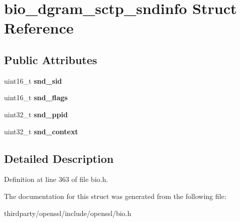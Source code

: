 \hypertarget{structbio__dgram__sctp__sndinfo}{}\section{bio\+\_\+dgram\+\_\+sctp\+\_\+sndinfo Struct Reference}
\label{structbio__dgram__sctp__sndinfo}
\subsection*{Public Attributes}
\begin{DoxyCompactItemize}
\item 
\mbox{\label{structbio__dgram__sctp__sndinfo_ab22988d5927028b0284c6cf18ff589dc}} 
uint16\+\_\+t {\bfseries snd\+\_\+sid}
\item 
\mbox{\label{structbio__dgram__sctp__sndinfo_ac0269a06039c3f2a59a258eabf0648d6}} 
uint16\+\_\+t {\bfseries snd\+\_\+flags}
\item 
\mbox{\label{structbio__dgram__sctp__sndinfo_a63933a21b96198ede95c5ab03b4884a1}} 
uint32\+\_\+t {\bfseries snd\+\_\+ppid}
\item 
\mbox{\label{structbio__dgram__sctp__sndinfo_a64de10bcaaadde29adef5a53ec28d9b3}} 
uint32\+\_\+t {\bfseries snd\+\_\+context}
\end{DoxyCompactItemize}


\subsection{Detailed Description}


Definition at line 363 of file bio.\+h.



The documentation for this struct was generated from the following file\+:\begin{DoxyCompactItemize}
\item 
thirdparty/openssl/include/openssl/bio.\+h\end{DoxyCompactItemize}
